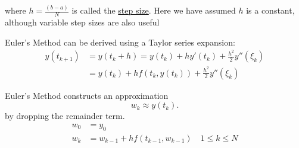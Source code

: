 \documentclass[12pt]{article}
\begin{document}
where $h= \frac{(b-a)}{N}$ is called the \uline{step size}. Here we have assumed
$h$ is a constant, although variable step sizes are also useful

Euler's Method can be derived using a Taylor series expansion:
\begin{align*}
  y(t_{k+1}) &= y(t_k+h) = y(t_k) + hy'(t_k) + \frac{h^2}{2} y '' (\xi_k) \\
             &= y(t_k) + hf(t_k, y(t_k)) + \frac{h^2}{2}y''(\xi_k)
\end{align*}

Euler's Method constructs an approximation
\[
w_k \approx y(t_k)
.\]
by dropping the remainder term.
\begin{align*}
  w_0 &= y_0 \\
  w_k &= w_{k-1} + hf(t_{k-1}, w_{k-1}) \quad 1 \leq k \leq N\\
\end{align*}
\end{document}
